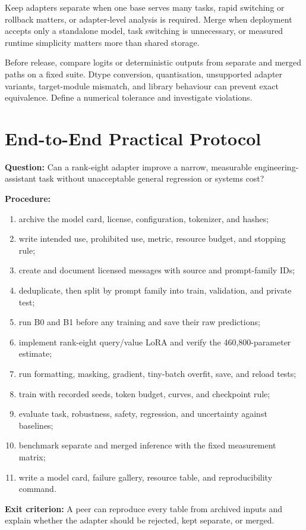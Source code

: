 Keep adapters separate when one base serves many tasks, rapid switching or
rollback matters, or adapter-level analysis is required.
Merge when deployment accepts only a standalone model, task switching is
unnecessary, or measured runtime simplicity matters more than shared storage.

\begin{engineernote}
Before release, compare logits or deterministic outputs from separate and
merged paths on a fixed suite.
Dtype conversion, quantisation, unsupported adapter variants, target-module
mismatch, and library behaviour can prevent exact equivalence.
Define a numerical tolerance and investigate violations.
\end{engineernote}

\section{End-to-End Practical Protocol}

\begin{practicallab}
\textbf{Question:}
Can a rank-eight adapter improve a narrow, measurable engineering-assistant
task without unacceptable general regression or systems cost?

\textbf{Procedure:}
\begin{enumerate}
    \item archive the model card, license, configuration, tokenizer, and hashes;
    \item write intended use, prohibited use, metric, resource budget, and
          stopping rule;
    \item create and document licensed messages with source and prompt-family
          IDs;
    \item deduplicate, then split by prompt family into train, validation, and
          private test;
    \item run B0 and B1 before any training and save their raw predictions;
    \item implement rank-eight query/value LoRA and verify the
          460,800-parameter estimate;
    \item run formatting, masking, gradient, tiny-batch overfit, save, and
          reload tests;
    \item train with recorded seeds, token budget, curves, and checkpoint rule;
    \item evaluate task, robustness, safety, regression, and uncertainty
          against baselines;
    \item benchmark separate and merged inference with the fixed measurement
          matrix;
    \item write a model card, failure gallery, resource table, and
          reproducibility command.
\end{enumerate}

\textbf{Exit criterion:}
A peer can reproduce every table from archived inputs and explain whether the
adapter should be rejected, kept separate, or merged.
\end{practicallab}

